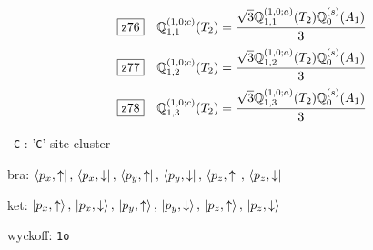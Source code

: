 \documentclass[fleqn,10pt,landscape]{jsarticle}
\begin{document}
\begin{dmath*}
\hspace*{3mm}\fbox{z76}\quad \mathbb{Q}_{1,1}^{(1,0;c)}(T_{2})=\frac{\sqrt{3} \mathbb{Q}_{1,1}^{(1,0;a)}(T_{2}) \mathbb{Q}_{0}^{(s)}(A_{1})}{3}
\end{dmath*}
\begin{dmath*}
\hspace*{3mm}\fbox{z77}\quad \mathbb{Q}_{1,2}^{(1,0;c)}(T_{2})=\frac{\sqrt{3} \mathbb{Q}_{1,2}^{(1,0;a)}(T_{2}) \mathbb{Q}_{0}^{(s)}(A_{1})}{3}
\end{dmath*}
\begin{dmath*}
\hspace*{3mm}\fbox{z78}\quad \mathbb{Q}_{1,3}^{(1,0;c)}(T_{2})=\frac{\sqrt{3} \mathbb{Q}_{1,3}^{(1,0;a)}(T_{2}) \mathbb{Q}_{0}^{(s)}(A_{1})}{3}
\end{dmath*}
\vspace{5mm}

\noindent\textbullet\, \texttt{C} : '\texttt{C}' site-cluster

\noindent\quad * bra: $\bra{p_{x},\uparrow},\, \bra{p_{x},\downarrow},\, \bra{p_{y},\uparrow},\, \bra{p_{y},\downarrow},\, \bra{p_{z},\uparrow},\, \bra{p_{z},\downarrow}$

\noindent\quad * ket: $\ket{p_{x},\uparrow},\, \ket{p_{x},\downarrow},\, \ket{p_{y},\uparrow},\, \ket{p_{y},\downarrow},\, \ket{p_{z},\uparrow},\, \ket{p_{z},\downarrow}$

\noindent\quad * wyckoff: \texttt{1o}
\end{document}
